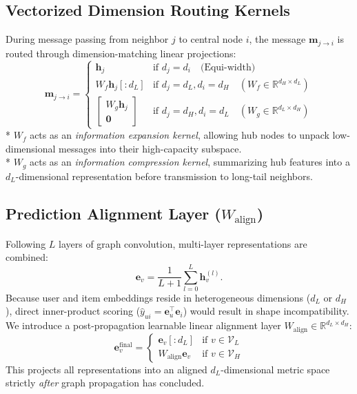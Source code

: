 \documentclass[11pt,a4paper]{article}
\begin{document}
\subsection{Vectorized Dimension Routing Kernels}
During message passing from neighbor $j$ to central node $i$, the message $\mathbf{m}_{j \to i}$ is routed through dimension-matching linear projections:
\begin{equation}
    \mathbf{m}_{j \to i} = \begin{cases}
    \mathbf{h}_j & \text{if } d_j = d_i \quad \text{(Equi-width)} \\
    W_f \mathbf{h}_j[:d_L] & \text{if } d_j = d_L, d_i = d_H \quad (W_f \in \mathbb{R}^{d_H \times d_L}) \\
    \begin{bmatrix} W_g \mathbf{h}_j \\ \mathbf{0} \end{bmatrix} & \text{if } d_j = d_H, d_i = d_L \quad (W_g \in \mathbb{R}^{d_L \times d_H})
    \end{cases}
\end{equation}
* $W_f$ acts as an \textit{information expansion kernel}, allowing hub nodes to unpack low-dimensional messages into their high-capacity subspace.\\
* $W_g$ acts as an \textit{information compression kernel}, summarizing hub features into a $d_L$-dimensional representation before transmission to long-tail neighbors.

\subsection{Prediction Alignment Layer ($W_{\text{align}}$)}
Following $L$ layers of graph convolution, multi-layer representations are combined:
\begin{equation}
    \mathbf{e}_v = \frac{1}{L + 1} \sum_{l=0}^L \mathbf{h}_v^{(l)}.
\end{equation}
Because user and item embeddings reside in heterogeneous dimensions ($d_L$ or $d_H$), direct inner-product scoring ($\hat{y}_{ui} = \mathbf{e}_u^\top \mathbf{e}_i$) would result in shape incompatibility. We introduce a post-propagation learnable linear alignment layer $W_{\text{align}} \in \mathbb{R}^{d_L \times d_H}$:
\begin{equation}
    \mathbf{e}_v^{\text{final}} = \begin{cases}
    \mathbf{e}_v[:d_L] & \text{if } v \in \mathcal{V}_L \\
    W_{\text{align}} \mathbf{e}_v & \text{if } v \in \mathcal{V}_H
    \end{cases}
\end{equation}
This projects all representations into an aligned $d_L$-dimensional metric space strictly \textit{after} graph propagation has concluded.
\end{document}
